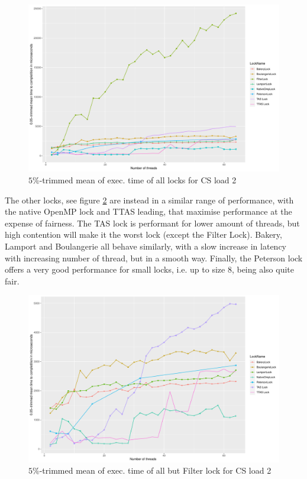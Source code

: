 \begin{figure}[H]
  \includegraphics[width=\textwidth]{fig/meantime_2_all}
  \caption{$5\%$-trimmed mean of exec. time of all locks for CS load 2}
  \label{fig:meantime-2-all}
\end{figure}

The other locks, see figure \ref{fig:meantime-2-no-filter} are instead in a similar
range of performance, with the native OpenMP lock and TTAS leading, that maximise
performance at the expense of fairness.
The TAS lock is performant for lower amount of threads, but high contention will
make it the worst lock (except the Filter Lock).
Bakery, Lamport and Boulangerie all behave similarly, with a slow increase in
latency with increasing number of thread, but in a smooth way.
Finally, the Peterson lock offers a very good performance for small locks, i.e.
up to size 8, being also quite fair.
\begin{figure}[H]
  \includegraphics[width=\textwidth]{fig/meantime_2_no_filter}
  \caption{$5\%$-trimmed mean of exec. time of all but Filter lock for CS load 2}
  \label{fig:meantime-2-no-filter}
\end{figure}

